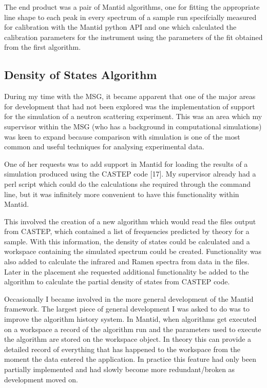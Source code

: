 \documentclass[paper=a4, fontsize=11pt]{scrartcl}	%
\numberwithin{equation}{section}															%
\numberwithin{figure}{section}																%
\numberwithin{table}{section}
\begin{document}
The end product was a pair of Mantid algorithms, one for fitting the
appropriate line shape to each peak in every spectrum of a sample run
specifcially measured for calibration with the Mantid python API and one
which calculated the calibration parameters for the instrument using the
parameters of the fit obtained from the first algorithm.

\subsection{Density of States
Algorithm}\label{density-of-states-algorithm}

During my time with the MSG, it became apparent that one of the major
areas for development that had not been explored was the implementation
of support for the simulation of a neutron scattering experiment. This
was an area which my supervisor within the MSG (who has a background in computational
simulations) was keen to expand because comparison with simulation is
one of the most common and useful techniques for analysing experimental
data.

One of her requests was to add support in Mantid for loading the results
of a simulation produced using the CASTEP code {[}17{]}. My supervisor
already had a perl script which could do the calculations she required
through the command line, but it was infinitely more convenient to have
this functionality within Mantid.

This involved the creation of a new algorithm which would read the files
output from CASTEP, which contained a list of frequencies predicted by
theory for a sample. With this information, the density of states could
be calculated and a workspace containing the simulated spectrum could be
created. Functionality was also added to calculate the infrared and
Ramen spectra from data in the files. Later in the placement she requested additional functionality be added to the algorithm to
calculate the partial density of states from CASTEP code.


Occasionally I became involved in the more general development of the
Mantid framework. The largest piece of general development I was asked
to do was to improve the algorithm history system. In Mantid, when
algorithms get executed on a workspace a record of the algorithm run and
the parameters used to execute the algorithm are stored on the workspace
object. In theory this can provide a detailed record of everything that
has happened to the workspace from the moment the data entered the
application. In practice this feature had only been partially
implemented and had slowly become more redundant/broken as development
moved on.
\end{document}
